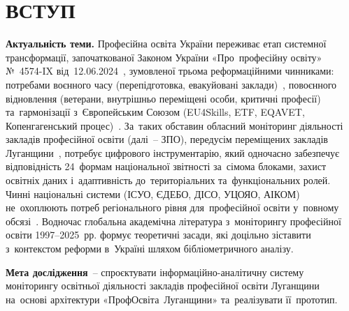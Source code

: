 
\section*{\centering ВСТУП}

\textbf{Актуальність теми.} Професійна освіта України переживає етап системної трансформації, започаткованої Законом України «Про~професійну освіту» №~4574-IX від~12.06.2024~\cite{Zakon4574IX}, зумовленої трьома реформаційними чинниками: потребами воєнного часу (перепідготовка, евакуйовані заклади)~\cite{Kremen2024EduWar, Radkevych2022Threats}, повоєнного відновлення (ветерани, внутрішньо переміщені особи, критичні професії)~\cite{Kostrytsia2025VETRecovery, Cherniakova2025WomenVET} та~гармонізації з~Європейським Союзом (EU4Skills, ETF, EQAVET, Копенгагенський процес)~\cite{Kulachynskyi2024EU4Skills, Storonyanska2025EuVET, Ciantar2025VETPolicy, Rauner2024EuropeanVET}. За~таких обставин обласний моніторинг діяльності закладів професійної освіти (далі~-- ЗПО), передусім переміщених закладів Луганщини~\cite{NMTsPTO2025, Semenenko2023DisplacedHEI}, потребує цифрового інструментарію, який одночасно забезпечує відповідність 24~формам національної звітності за~сімома блоками, захист освітніх даних і~адаптивність до~територіальних та~функціональних ролей. Чинні національні системи (ІСУО, ЄДЕБО, ДІСО, УЦОЯО, АІКОМ) не~охоплюють потреб регіонального рівня для~професійної освіти у~повному обсязі~\cite{Bieliaieva2020InfoMech, Khozhylo2024PublicMgmt, Shatalovych2025NMT}. Водночас глобальна академічна література з~моніторингу професійної освіти 1997--2025~рр. формує теоретичні засади, які доцільно зіставити з~контекстом реформи в~Україні шляхом бібліометричного аналізу.

\textbf{Мета дослідження}~-- спроєктувати інформаційно-аналітичну систему моніторингу освітньої діяльності закладів професійної освіти Луганщини на~основі архітектури «ПрофОсвіта~Луганщини» та~реалізувати її~прототип.

